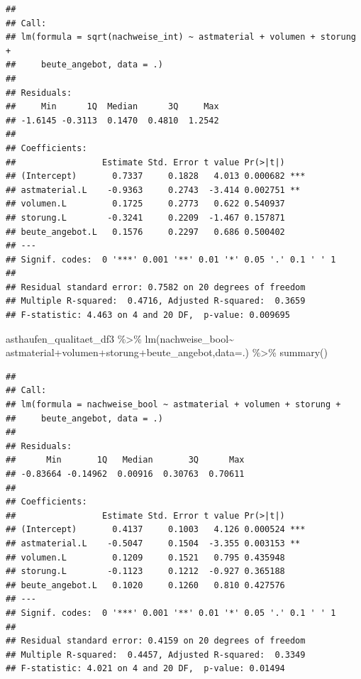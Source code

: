 \documentclass[
  oneside]{scrbook}
\newenvironment{Shaded}{\begin{snugshade}}{\end{snugshade}}
\newcommand{\AttributeTok}[1]{\textcolor[rgb]{0.77,0.63,0.00}{#1}}
\newcommand{\FunctionTok}[1]{\textcolor[rgb]{0.00,0.00,0.00}{#1}}
\newcommand{\NormalTok}[1]{#1}
\newcommand{\SpecialCharTok}[1]{\textcolor[rgb]{0.00,0.00,0.00}{#1}}
\begin{document}
\begin{verbatim}
## 
## Call:
## lm(formula = sqrt(nachweise_int) ~ astmaterial + volumen + storung + 
##     beute_angebot, data = .)
## 
## Residuals:
##     Min      1Q  Median      3Q     Max 
## -1.6145 -0.3113  0.1470  0.4810  1.2542 
## 
## Coefficients:
##                 Estimate Std. Error t value Pr(>|t|)    
## (Intercept)       0.7337     0.1828   4.013 0.000682 ***
## astmaterial.L    -0.9363     0.2743  -3.414 0.002751 ** 
## volumen.L         0.1725     0.2773   0.622 0.540937    
## storung.L        -0.3241     0.2209  -1.467 0.157871    
## beute_angebot.L   0.1576     0.2297   0.686 0.500402    
## ---
## Signif. codes:  0 '***' 0.001 '**' 0.01 '*' 0.05 '.' 0.1 ' ' 1
## 
## Residual standard error: 0.7582 on 20 degrees of freedom
## Multiple R-squared:  0.4716, Adjusted R-squared:  0.3659 
## F-statistic: 4.463 on 4 and 20 DF,  p-value: 0.009695
\end{verbatim}

\begin{Shaded}
\begin{Highlighting}[]
\NormalTok{asthaufen\_qualitaet\_df3 }\SpecialCharTok{\%\textgreater{}\%} \FunctionTok{lm}\NormalTok{(nachweise\_bool}\SpecialCharTok{\textasciitilde{}}
\NormalTok{             astmaterial}\SpecialCharTok{+}\NormalTok{volumen}\SpecialCharTok{+}\NormalTok{storung}\SpecialCharTok{+}\NormalTok{beute\_angebot,}\AttributeTok{data=}\NormalTok{.) }\SpecialCharTok{\%\textgreater{}\%}
  \FunctionTok{summary}\NormalTok{()}
\end{Highlighting}
\end{Shaded}

\begin{verbatim}
## 
## Call:
## lm(formula = nachweise_bool ~ astmaterial + volumen + storung + 
##     beute_angebot, data = .)
## 
## Residuals:
##      Min       1Q   Median       3Q      Max 
## -0.83664 -0.14962  0.00916  0.30763  0.70611 
## 
## Coefficients:
##                 Estimate Std. Error t value Pr(>|t|)    
## (Intercept)       0.4137     0.1003   4.126 0.000524 ***
## astmaterial.L    -0.5047     0.1504  -3.355 0.003153 ** 
## volumen.L         0.1209     0.1521   0.795 0.435948    
## storung.L        -0.1123     0.1212  -0.927 0.365188    
## beute_angebot.L   0.1020     0.1260   0.810 0.427576    
## ---
## Signif. codes:  0 '***' 0.001 '**' 0.01 '*' 0.05 '.' 0.1 ' ' 1
## 
## Residual standard error: 0.4159 on 20 degrees of freedom
## Multiple R-squared:  0.4457, Adjusted R-squared:  0.3349 
## F-statistic: 4.021 on 4 and 20 DF,  p-value: 0.01494
\end{verbatim}
\end{document}
